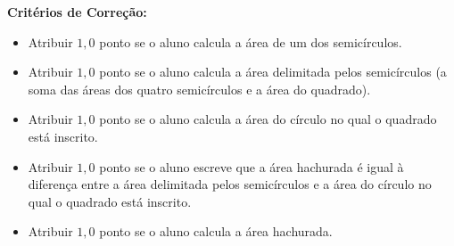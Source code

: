 \documentclass[oneside,a4paper,12pt]{article}
\theoremstyle{Colorido}
\theoremstyle{solu}
\theoremstyle{dotlessP}
\begin{document}
\begin{mdframed}
\textbf{Critérios de Correção:} \\
\begin{itemize}
    \item Atribuir $1,0$ ponto se o aluno calcula a área de um dos semicírculos.
    \item Atribuir $1,0$ ponto se o aluno calcula a área delimitada pelos semicírculos (a soma das áreas dos quatro semicírculos e a área do quadrado).
    \item Atribuir $1,0$ ponto se o aluno calcula a área do círculo no qual o quadrado está inscrito.
    \item Atribuir $1,0$ ponto se o aluno escreve que a área hachurada é igual à diferença entre a área delimitada pelos semicírculos e a área do círculo no qual o quadrado está inscrito.
    \item Atribuir $1,0$ ponto se o aluno calcula a área hachurada.
\end{itemize}
\end{mdframed}
		
	

		

		
		
		
		
		
	\flushbottom
	\flushright
\end{document}
